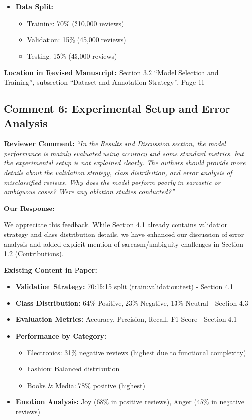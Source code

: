 \documentclass[11pt,a4paper]{article}
\begin{document}
\begin{itemize}[leftmargin=*]
    \item \textbf{Data Split:}
    \begin{itemize}
        \item Training: 70\% (210,000 reviews)
        \item Validation: 15\% (45,000 reviews)
        \item Testing: 15\% (45,000 reviews)
    \end{itemize}
\end{itemize}

\textbf{Location in Revised Manuscript:} Section 3.2 ``Model Selection and Training'', subsection ``Dataset and Annotation Strategy'', Page 11


\subsection*{Comment 6: Experimental Setup and Error Analysis}

\textbf{Reviewer Comment:} \textit{``In the Results and Discussion section, the model performance is mainly evaluated using accuracy and some standard metrics, but the experimental setup is not explained clearly. The authors should provide more details about the validation strategy, class distribution, and error analysis of misclassified reviews. Why does the model perform poorly in sarcastic or ambiguous cases? Were any ablation studies conducted?''}

\vspace{6pt}

\textbf{Our Response:}

We appreciate this feedback. While Section 4.1 already contains validation strategy and class distribution details, we have enhanced our discussion of error analysis and added explicit mention of sarcasm/ambiguity challenges in Section 1.2 (Contributions).

\textbf{Existing Content in Paper:}
\begin{itemize}[leftmargin=*]
    \item \textbf{Validation Strategy:} 70:15:15 split (train:validation:test) - Section 4.1
    \item \textbf{Class Distribution:} 64\% Positive, 23\% Negative, 13\% Neutral - Section 4.3
    \item \textbf{Evaluation Metrics:} Accuracy, Precision, Recall, F1-Score - Section 4.1
    \item \textbf{Performance by Category:}
    \begin{itemize}
        \item Electronics: 31\% negative reviews (highest due to functional complexity)
        \item Fashion: Balanced distribution
        \item Books \& Media: 78\% positive (highest)
    \end{itemize}
    \item \textbf{Emotion Analysis:} Joy (68\% in positive reviews), Anger (45\% in negative reviews)
\end{itemize}
\end{document}
